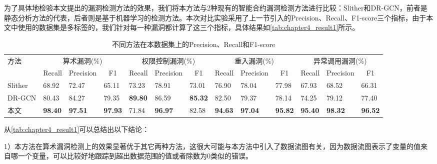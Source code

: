 为了具体地检验本文提出的漏洞检测方法的效果，我们将本方法与2种现有的智能合约漏洞检测方法进行比较：Slither\cite{slither}和DR-GCN\cite{dr-gcn}，前者是静态分析方法的代表，后者则是基于机器学习的检测方法。本次对比实验采用了上一节引入的Precision、Recall、F1-score三个指标，由于本文中使用的数据集是多标签的，我们针对每一种漏洞都计算了这三个指标，具体结果如\autoref{tab:chapter4_result1}所示。
\begin{table}[htbp]
    \caption{\label{tab:chapter4_result1}不同方法在本数据集上的Precision、Recall和F1-score}
    \fontsize{8pt}{10pt}\selectfont
    \renewcommand{\arraystretch}{1.5}
    \begin{tabularx}{\linewidth}{p{1.3cm}|X<{\centering}X<{\centering}X<{\centering}|X<{\centering}X<{\centering}X<{\centering}|X<{\centering}X<{\centering}X<{\centering}|X<{\centering}X<{\centering}X<{\centering}}
        \hline
        \multirow{2}{*}{方法} & \multicolumn{3}{c|}{算术漏洞(\%)} & \multicolumn{3}{c|}{权限控制漏洞(\%)} & \multicolumn{3}{c|}{重入漏洞(\%)} & \multicolumn{3}{c}{异常调用漏洞(\%)} \\ \cline{2-13} 
                            & \multicolumn{1}{c}{Recall} & \multicolumn{1}{c}{Precision} & \multicolumn{1}{c|}{F1} & \multicolumn{1}{c}{Recall} & \multicolumn{1}{c}{Precision} & \multicolumn{1}{c|}{F1} & \multicolumn{1}{c}{Recall} & \multicolumn{1}{c}{Precision} & \multicolumn{1}{c|}{F1} & \multicolumn{1}{c}{Recall} & \multicolumn{1}{c}{Precision} & \multicolumn{1}{c}{F1} \\ \hline
        Slither & 68.92 & 72.47 & 65.11       & 73.23 & 78.91 & 73.01       & 76.90 & 78.04 & 77.98       & 67.93 & 68.52 & 66.31      \\
        DR-GCN & 80.43 & 84.27 & 79.35       & \textbf{89.80} & 86.59 & \textbf{85.32} & 82.50 & 79.37 & 78.14       & 74.25 & 79.12 & 77.40      \\
        本文      & \textbf{98.40} & \textbf{97.51}    & \textbf{97.93} & 71.84 & \textbf{96.97}    & 82.58       & \textbf{94.63} & \textbf{97.04}    & \textbf{95.82} & \textbf{95.40} & \textbf{98.32}    & \textbf{96.52}         \\ \hline
        \end{tabularx}
\end{table}

从\autoref{tab:chapter4_result1}可以总结出以下结论：

1）本方法在算术漏洞检测上的效果显著优于其它两种方法，这很大可能与本方法中引入了数据流图有关，因为数据流图表示了变量的值来自哪一个变量，可以比较好地跟踪到超出数据范围的值或者除数为0类似的错误。

